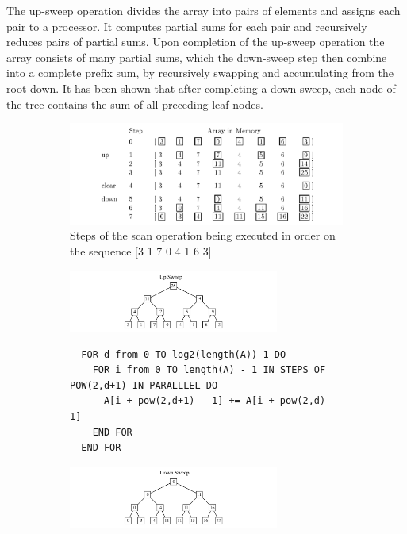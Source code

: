   The up-sweep operation divides the array into pairs of elements and assigns each pair to a processor. It computes partial sums for each pair and 
  recursively reduces pairs of partial sums. Upon completion of the up-sweep operation the array consists of many partial sums, which the down-sweep step then combine 
  into a complete prefix sum, by recursively swapping and accumulating from the root down. It has been shown \cite{blelloch1990prefix} that after completing a down-sweep, each node of
  the tree contains the sum of all preceding leaf nodes.
  \begin{figure}[h!]
  \begin{mdframed}
    \centering
    \begin{subfigure}[b]{0.8\textwidth}
      \includegraphics[width=\textwidth]{scanOperationOnArray.png}
      \caption{Steps of the scan operation being executed in order on the sequence [3 1 7 0 4 1 6 3]}
      \label{UPSWEEP_DOWNSWEEP}
    \end{subfigure}
    \begin{subfigure}[b]{\textwidth}
      \centering
      \includegraphics[width=0.76\textwidth]{upsweep.png}
      \begin{minipage}{\textwidth}
        \begin{lstlisting}
  FOR d from 0 TO log2(length(A))-1 DO
    FOR i from 0 TO length(A) - 1 IN STEPS OF POW(2,d+1) IN PARALLLEL DO
      A[i + pow(2,d+1) - 1] += A[i + pow(2,d) - 1]
    END FOR
  END FOR
	\end{lstlisting}
	\end{minipage}
	\includegraphics[width=0.76\textwidth]{downsweep.png}

\end{subfigure}
\end{mdframed}
\end{figure}
